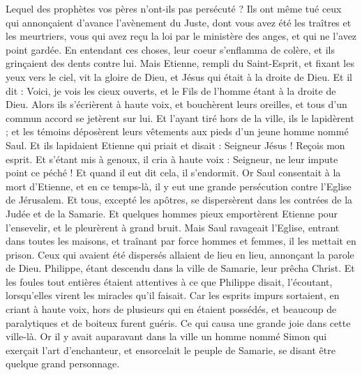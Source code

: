 \begin{multicols}{2}
{Lequel des prophètes vos pères n'ont-ils pas persécuté ? Ils ont même tué ceux qui annonçaient d'avance l'avènement du Juste, dont vous avez été les traîtres et les meurtriers,
vous qui avez reçu la loi par le ministère des anges, et qui ne l'avez point gardée.
En entendant ces choses, leur coeur s'enflamma de colère, et ils grinçaient des dents contre lui.
Mais Etienne, rempli du Saint-Esprit, et fixant les yeux vers le ciel, vit la gloire de Dieu, et Jésus qui était à la droite de Dieu.
Et il dit : Voici, je vois les cieux ouverts, et le Fils de l'homme étant à la droite de Dieu.
Alors ils s'écrièrent à haute voix, et bouchèrent leurs oreilles, et tous d'un commun accord se jetèrent sur lui.
Et l'ayant tiré hors de la ville, ils le lapidèrent ; et les témoins déposèrent leurs vêtements aux pieds d'un jeune homme nommé Saul.
Et ils lapidaient Etienne qui priait et disait : Seigneur Jésus ! Reçois mon esprit.
Et s'étant mis à genoux, il cria à haute voix : Seigneur, ne leur impute point ce péché ! Et quand il eut dit cela, il s'endormit.
\VerseOne{}Or Saul consentait à la mort d'Etienne, et en ce temps-là, il y eut une grande persécution contre l'Eglise de Jérusalem. Et tous, excepté les apôtres, se dispersèrent dans les contrées de la Judée et de la Samarie.
Et quelques hommes pieux emportèrent Etienne pour l'ensevelir, et le pleurèrent à grand bruit.
Mais Saul ravageait l'Eglise, entrant dans toutes les maisons, et traînant par force hommes et femmes, il les mettait en prison.
Ceux qui avaient été dispersés allaient de lieu en lieu, annonçant la parole de Dieu.
Philippe, étant descendu dans la ville de Samarie, leur prêcha Christ.
Et les foules tout entières étaient attentives à ce que Philippe disait, l'écoutant, lorsqu'elles virent les miracles qu'il faisait.
Car les esprits impurs sortaient, en criant à haute voix, hors de plusieurs qui en étaient possédés, et beaucoup de paralytiques et de boiteux furent guéris.
Ce qui causa une grande joie dans cette ville-là.
Or il y avait auparavant dans la ville un homme nommé Simon qui exerçait l'art d'enchanteur, et ensorcelait le peuple de Samarie, se disant être quelque grand personnage.
}
\end{multicols}

